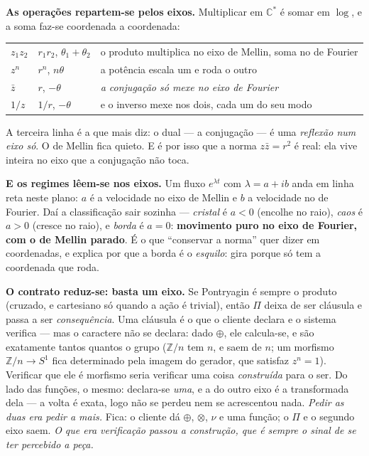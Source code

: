 \documentclass[11pt]{article}
\newcommand{\Z}{\mathbb Z}
\newcommand{\C}{\mathbb C}
\theoremstyle{plain}
\theoremstyle{remark}
\begin{document}
\begin{itemize}
\textbf{As operações repartem-se pelos eixos.} Multiplicar em $\C^*$ é somar em $\log$, e a soma
faz-se coordenada a coordenada:
\begin{center}
\begin{tabular}{lll}
$z_1z_2$ & $r_1r_2$, $\theta_1+\theta_2$ & o produto multiplica no eixo de Mellin, soma no de Fourier \\
$z^n$ & $r^n$, $n\theta$ & a potência escala um e roda o outro \\
$\bar z$ & $r$, $-\theta$ & \emph{a conjugação só mexe no eixo de Fourier} \\
$1/z$ & $1/r$, $-\theta$ & e o inverso mexe nos dois, cada um do seu modo \\
\end{tabular}
\end{center}
A terceira linha é a que mais diz: o dual --- a conjugação --- é uma \emph{reflexão num eixo só}.
O de Mellin fica quieto. E é por isso que a norma $z\bar z=r^2$ é real: ela vive inteira no eixo
que a conjugação não toca.

\textbf{E os regimes lêem-se nos eixos.} Um fluxo $e^{\lambda t}$ com $\lambda=a+ib$ anda em linha
reta neste plano: $a$ é a velocidade no eixo de Mellin e $b$ a velocidade no de Fourier. Daí a
classificação sair sozinha --- \emph{cristal} é $a<0$ (encolhe no raio), \emph{caos} é $a>0$
(cresce no raio), e \emph{borda} é $a=0$: \textbf{movimento puro no eixo de Fourier, com o de
Mellin parado}. É o que ``conservar a norma'' quer dizer em coordenadas, e explica por que a borda
é o \emph{esquilo}: gira porque só tem a coordenada que roda.

\textbf{O contrato reduz-se: basta um eixo.} Se Pontryagin é sempre o produto (cruzado, e
cartesiano só quando a ação é trivial), então
$\Pi$ deixa de ser cláusula e passa a ser \emph{consequência}. Uma cláusula é o que o cliente
declara e o sistema verifica --- mas o caractere não se declara: dado $\oplus$, ele calcula-se, e
são exatamente tantos quantos o grupo ($\Z/n$ tem $n$, e saem de $n$; um morfismo
$\Z/n\to S^1$ fica determinado pela imagem do gerador, que satisfaz $z^n=1$). Verificar que ele é
morfismo seria verificar uma coisa \emph{construída} para o ser. Do lado das funções, o mesmo:
declara-se \emph{uma}, e a do outro eixo é a transformada dela --- a volta é exata, logo não se
perdeu nem se acrescentou nada. \emph{Pedir as duas era pedir a mais.} Fica: o cliente dá
$\oplus$, $\otimes$, $\nu$ e uma função; o $\Pi$ e o segundo eixo saem. \emph{O que era
verificação passou a construção, que é sempre o sinal de se ter percebido a peça.}


\end{itemize}
\end{document}
